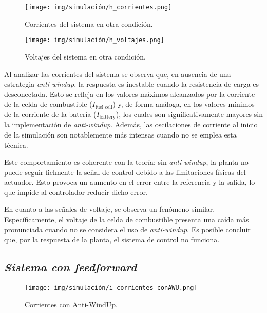\begin{figure}[H]
    \centering
    \texttt{[image: img/simulación/h\_corrientes.png]}
    \caption{Corrientes del sistema en otra condición.}
    \label{fig:h_corrientes}
\end{figure}

\begin{figure}[H]
    \centering
    \texttt{[image: img/simulación/h\_voltajes.png]}
    \caption{Voltajes del sistema en otra condición.}
    \label{fig:h_voltajes}
\end{figure}
Al analizar las corrientes del sistema se observa que, en ausencia de una estrategia 
\textit{anti-windup}, la respuesta es inestable cuando la resistencia de carga es desconectada.
Esto se refleja en los valores máximos alcanzados por la corriente de la celda de 
combustible ($I_{\text{fuel cell}}$) y, de forma análoga, en los valores 
mínimos de la corriente de la batería ($I_{\text{battery}}$), los cuales son significativamente 
mayores sin la implementación de \textit{anti-windup}. Además, las oscilaciones de corriente 
al inicio de la simulación son notablemente más intensas cuando no se emplea esta técnica.

Este comportamiento es coherente con la teoría: sin 
\textit{anti-windup}, la planta no puede seguir fielmente la señal de control debido a las limitaciones
físicas del actuador. Esto provoca un aumento en el error entre la referencia y la salida, 
lo que impide al controlador reducir dicho error.

En cuanto a las señales de voltaje, se observa un fenómeno similar. 
Específicamente, el voltaje de la celda de combustible presenta una 
caída más pronunciada cuando no se considera el uso de \textit{anti-windup}. Es posible concluir que, por la respuesta
de la planta, el sistema de control no funciona.
\subsection{\textit{Sistema con feedforward}}

\begin{figure}[H]
    \centering
    \texttt{[image: img/simulación/i\_corrientes\_conAWU.png]}
    \caption{Corrientes con Anti-WindUp.}
    \label{fig:i_corrientes_conAWU}
\end{figure}

